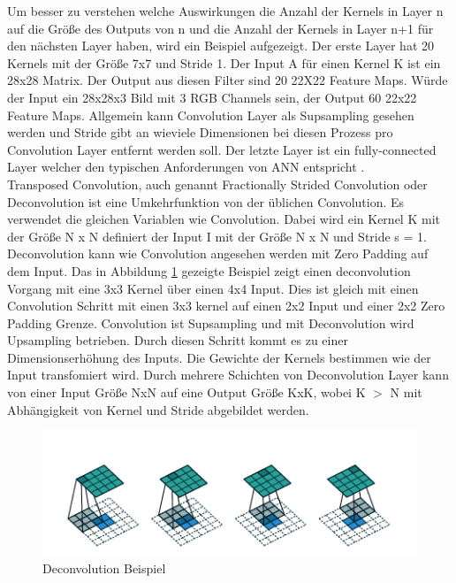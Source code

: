 \documentclass{llncs}
\begin{document}
Um  besser zu verstehen welche Auswirkungen die Anzahl der Kernels in Layer n auf die Größe des Outputs von n und die Anzahl der Kernels in Layer n+1 für den nächsten Layer haben, wird ein Beispiel aufgezeigt. Der erste Layer hat 20 Kernels mit der Größe 7x7 und Stride 1. Der Input A für einen Kernel K ist ein 28x28 Matrix. Der Output aus diesen Filter sind 20 22X22 Feature Maps. Würde der Input ein 28x28x3 Bild mit 3 RGB Channels sein, der Output 60 22x22 Feature Maps. Allgemein kann Convolution Layer als Supsampling gesehen werden und Stride gibt an wieviele Dimensionen bei diesen Prozess pro Convolution Layer entfernt werden soll. Der letzte Layer ist ein fully-connected Layer welcher den typischen Anforderungen von ANN entspricht \cite{conv}.  
\\
Transposed Convolution, auch genannt Fractionally Strided Convolution oder Deconvolution ist eine Umkehrfunktion von der üblichen Convolution. Es verwendet die gleichen Variablen wie Convolution. Dabei wird ein Kernel K mit der Größe N x N definiert der Input I mit der Größe N x N und Stride s = 1. Deconvolution kann wie Convolution angesehen werden mit  Zero Padding auf dem Input.  Das in Abbildung \ref{fig:Bild4} gezeigte Beispiel zeigt einen deconvolution Vorgang mit eine 3x3 Kernel über einen 4x4 Input. Dies ist gleich mit einen Convolution Schritt mit einen 3x3 kernel auf einen 2x2 Input und einer 2x2 Zero Padding Grenze. Convolution ist Supsampling und mit Deconvolution wird Upsampling betrieben. Durch diesen Schritt kommt es zu einer Dimensionserhöhung des Inputs. Die Gewichte der Kernels bestimmen wie der Input transfomiert wird. Durch mehrere Schichten von Deconvolution Layer kann von einer Input Größe NxN auf eine Output Größe KxK, wobei K $>$ N mit Abhängigkeit von Kernel und Stride abgebildet werden\cite{conv}. 

\begin{figure}[htbp] 
	\centering
	\includegraphics[width=1.0\textwidth]{decon.png}
	\caption{Deconvolution Beispiel}
	\label{fig:Bild4}
\end{figure}
\newpage
\end{document}
